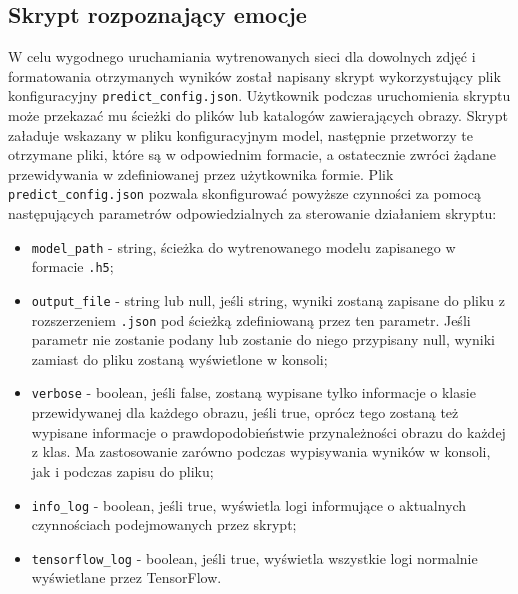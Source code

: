 \subsection{Skrypt rozpoznający emocje}
W celu wygodnego uruchamiania wytrenowanych sieci dla dowolnych zdjęć i formatowania otrzymanych wyników został napisany skrypt wykorzystujący plik konfiguracyjny \verb|predict_config.json|.
Użytkownik podczas uruchomienia skryptu może przekazać mu ścieżki do plików lub katalogów zawierających obrazy. Skrypt załaduje wskazany w pliku konfiguracyjnym model, następnie przetworzy te otrzymane pliki, które są w odpowiednim formacie, a ostatecznie zwróci żądane przewidywania w zdefiniowanej przez użytkownika formie. Plik \verb|predict_config.json| pozwala skonfigurować powyższe czynności za pomocą następujących parametrów odpowiedzialnych za sterowanie działaniem skryptu:
\begin{itemize}
    \item \verb|model_path| - string, ścieżka do wytrenowanego modelu zapisanego w formacie \verb|.h5|;
    \item \verb|output_file| - string lub null, jeśli string, wyniki zostaną zapisane do pliku z rozszerzeniem \verb|.json| pod ścieżką zdefiniowaną przez ten parametr. Jeśli parametr nie zostanie podany lub zostanie do niego przypisany null, wyniki zamiast do pliku zostaną wyświetlone w konsoli;
    \item \verb|verbose| - boolean, jeśli false, zostaną wypisane tylko informacje o klasie przewidywanej dla każdego obrazu, jeśli true, oprócz tego zostaną też wypisane informacje o prawdopodobieństwie przynależności obrazu do każdej z klas. Ma zastosowanie zarówno podczas wypisywania wyników w konsoli, jak i podczas zapisu do pliku; 
    \item \verb|info_log| - boolean, jeśli true, wyświetla logi informujące o aktualnych czynnościach podejmowanych przez skrypt;
    \item \verb|tensorflow_log| - boolean, jeśli true, wyświetla wszystkie logi normalnie wyświetlane przez TensorFlow.
\end{itemize}


